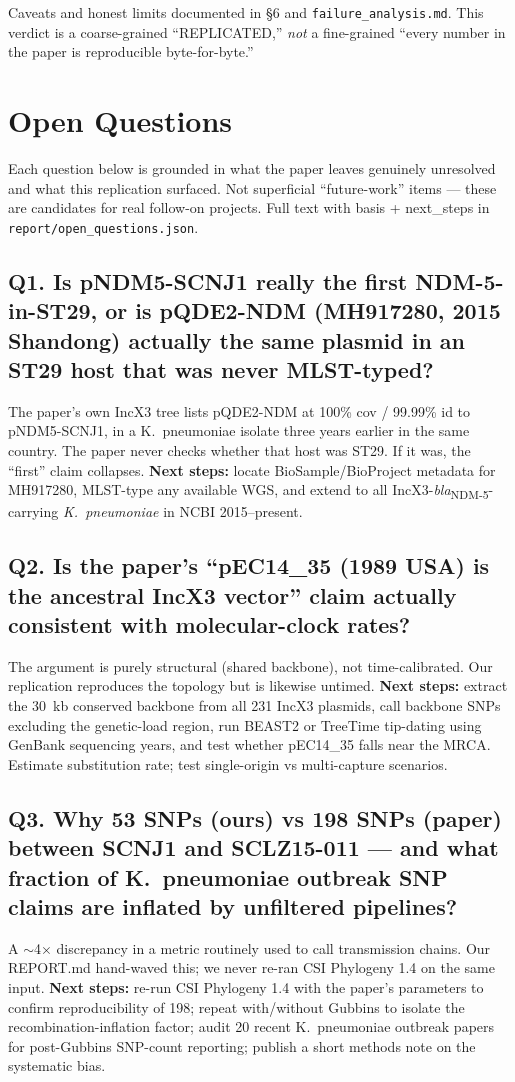 \documentclass[11pt,letterpaper]{article}
\begin{document}
Caveats and honest limits documented in \S6 and \texttt{failure\_analysis.md}. This verdict is a coarse-grained ``REPLICATED,'' \emph{not} a fine-grained ``every number in the paper is reproducible byte-for-byte.''

\section{Open Questions}
\label{sec:open}

Each question below is grounded in what the paper leaves genuinely unresolved and what this replication surfaced. Not superficial ``future-work'' items --- these are candidates for real follow-on projects. Full text with basis + next\_steps in \texttt{report/open\_questions.json}.

\subsection*{Q1. Is pNDM5-SCNJ1 really the first NDM-5-in-ST29, or is pQDE2-NDM (MH917280, 2015 Shandong) actually the same plasmid in an ST29 host that was never MLST-typed?}
The paper's own IncX3 tree lists pQDE2-NDM at 100\% cov / 99.99\% id to pNDM5-SCNJ1, in a K.\ pneumoniae isolate three years earlier in the same country. The paper never checks whether that host was ST29. If it was, the ``first'' claim collapses. \textbf{Next steps:} locate BioSample/BioProject metadata for MH917280, MLST-type any available WGS, and extend to all IncX3-\textit{bla}\textsubscript{NDM-5}-carrying \textit{K.\ pneumoniae} in NCBI 2015--present.

\subsection*{Q2. Is the paper's ``pEC14\_35 (1989 USA) is the ancestral IncX3 vector'' claim actually consistent with molecular-clock rates?}
The argument is purely structural (shared backbone), not time-calibrated. Our replication reproduces the topology but is likewise untimed. \textbf{Next steps:} extract the 30~kb conserved backbone from all 231 IncX3 plasmids, call backbone SNPs excluding the genetic-load region, run BEAST2 or TreeTime tip-dating using GenBank sequencing years, and test whether pEC14\_35 falls near the MRCA. Estimate substitution rate; test single-origin vs multi-capture scenarios.

\subsection*{Q3. Why 53 SNPs (ours) vs 198 SNPs (paper) between SCNJ1 and SCLZ15-011 --- and what fraction of K.\ pneumoniae outbreak SNP claims are inflated by unfiltered pipelines?}
A $\sim$4$\times$ discrepancy in a metric routinely used to call transmission chains. Our REPORT.md hand-waved this; we never re-ran CSI Phylogeny 1.4 on the same input. \textbf{Next steps:} re-run CSI Phylogeny 1.4 with the paper's parameters to confirm reproducibility of 198; repeat with/without Gubbins to isolate the recombination-inflation factor; audit 20 recent K.\ pneumoniae outbreak papers for post-Gubbins SNP-count reporting; publish a short methods note on the systematic bias.
\end{document}
